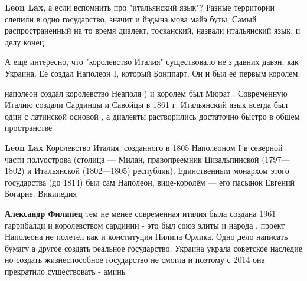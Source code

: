 \begin{itemize}
\begin{itemize}
 
\textbf{Leon Lax}, а если вспомнить про "итальянский язык"? Разные территории слепили в одно государство, значит и йэдына мова майэ буты. Самый распространенный на то время диалект, тосканский, назвали итальянский язык, и делу конец

 
А еще интересно, что "королевство Италия" существовало не з давних давэн, как Украина. Ее создал Наполеон I, который Бонппарт. Он и был её первым королем.

 
наполеон создал королевство Неаполя ) и королем был Мюрат . Современную Италию создали Сардинцы и Савойцы в 1861 г. Итальянский язык всегда был один с латинской основой , а диалекты растворились достаточно быстро в обшем пространстве

 
\textbf{Leon Lax} Королевство Италия, созданного в 1805 Наполеоном I в северной части полуострова (столица — Милан, правопреемник Цизальпинской (1797—1802) и Итальянской (1802—1805) республик). Единственным монархом этого государства (до 1814) был сам Наполеон, вице-королём — его пасынок Евгений Богарне.
Википедия

 
\textbf{Александр Филипец} тем не менее современная италия была создана 1961
гаррибалди и королевством сардинии - это был союз элиты и народа . проект
Наполеона не полетел как и конституция Пилипа Орлика. Одно дело написать бумагу
а другое создать реальное государство. Украина украла советское наследие но
создать жизнеспособное государство не смогла и поэтому с 2014 она прекратило
сушествовать - аминь


\end{itemize}
\end{itemize}
